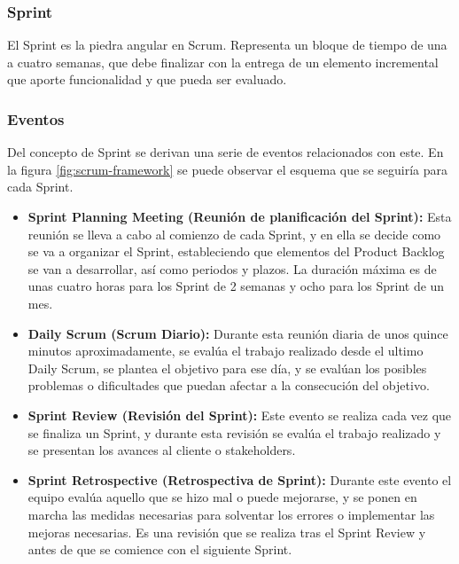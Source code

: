 \subsubsection{Sprint}

El Sprint es la piedra angular en Scrum. Representa un bloque de tiempo de una a cuatro semanas, que debe finalizar con la entrega de un elemento incremental que aporte funcionalidad y que pueda ser evaluado.

\subsubsection{Eventos}

Del concepto de Sprint se derivan una serie de eventos relacionados con este. En la figura \ref{fig:scrum-framework} se puede observar el esquema que se seguiría para cada Sprint.
\begin{itemize}
\item \textbf{Sprint Planning Meeting (Reunión de planificación del Sprint):} Esta reunión se lleva a cabo al comienzo de cada Sprint, y en ella se decide como se va a organizar el Sprint, estableciendo que elementos del Product Backlog se van a desarrollar, así como periodos y plazos. La duración máxima es de unas cuatro horas para los Sprint de 2 semanas y ocho para los Sprint de un mes.
\item \textbf{Daily Scrum (Scrum Diario):} Durante esta reunión diaria de unos quince minutos aproximadamente, se evalúa el trabajo realizado desde el ultimo Daily Scrum, se plantea el objetivo para ese día, y se evalúan los posibles problemas o dificultades que puedan afectar a la consecución del objetivo.
\item \textbf{Sprint Review (Revisión del Sprint):} Este evento se realiza cada vez que se finaliza un Sprint, y durante esta revisión se evalúa el trabajo realizado y se presentan los avances al cliente o stakeholders.
\item \textbf{Sprint Retrospective (Retrospectiva de Sprint):} Durante este evento el equipo evalúa aquello que se hizo mal o puede mejorarse, y se ponen en marcha las medidas necesarias para solventar los errores o implementar las mejoras necesarias. Es una revisión que se realiza tras el Sprint Review y antes de que se comience con el siguiente Sprint.
\end{itemize}

